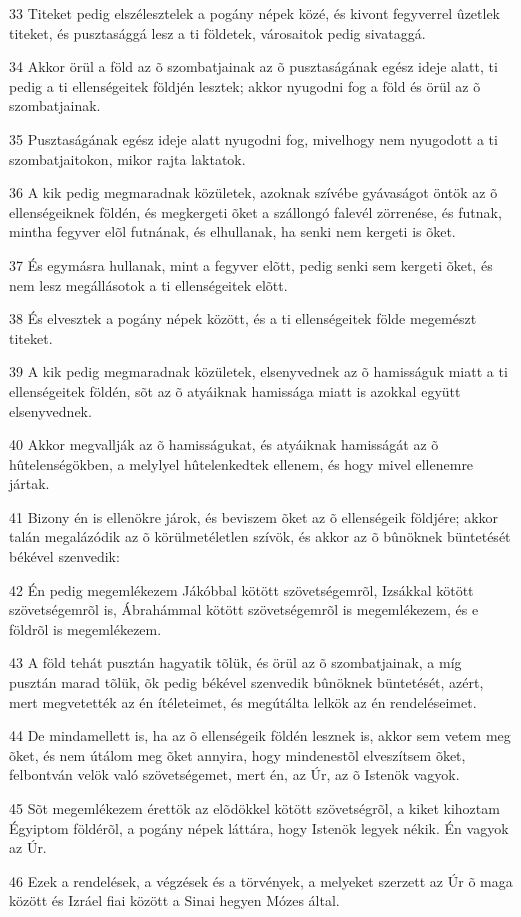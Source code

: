\par 33 Titeket pedig elszélesztelek a pogány népek közé, és kivont fegyverrel ûzetlek titeket, és pusztasággá lesz a ti földetek, városaitok pedig sivataggá.
\par 34 Akkor örül a föld az õ szombatjainak az õ pusztaságának egész ideje alatt, ti pedig a ti ellenségeitek földjén lesztek; akkor nyugodni fog a föld és örül az õ szombatjainak.
\par 35 Pusztaságának egész ideje alatt nyugodni fog, mivelhogy nem nyugodott a ti szombatjaitokon, mikor rajta laktatok.
\par 36 A kik pedig megmaradnak közületek, azoknak szívébe gyávaságot öntök az õ ellenségeiknek földén, és megkergeti õket a szállongó falevél zörrenése, és futnak, mintha fegyver elõl futnának, és elhullanak, ha senki nem kergeti is õket.
\par 37 És egymásra hullanak, mint a fegyver elõtt, pedig senki sem kergeti õket, és nem lesz megállásotok a ti ellenségeitek elõtt.
\par 38 És elvesztek a pogány népek között, és a ti ellenségeitek földe megemészt titeket.
\par 39 A kik pedig megmaradnak közületek, elsenyvednek az õ hamisságuk miatt a ti ellenségeitek földén, sõt az õ atyáiknak hamissága miatt is azokkal együtt elsenyvednek.
\par 40 Akkor megvallják az õ hamisságukat, és atyáiknak hamisságát az õ hûtelenségökben, a melylyel hûtelenkedtek ellenem, és hogy mivel ellenemre jártak.
\par 41 Bizony én is ellenökre járok, és beviszem õket az õ ellenségeik földjére; akkor talán megalázódik az õ körülmetéletlen szívök, és akkor az õ bûnöknek büntetését békével szenvedik:
\par 42 Én pedig megemlékezem Jákóbbal kötött szövetségemrõl, Izsákkal kötött szövetségemrõl is, Ábrahámmal kötött szövetségemrõl is megemlékezem, és e földrõl is megemlékezem.
\par 43 A föld tehát pusztán hagyatik tõlük, és örül az õ szombatjainak, a míg pusztán marad tõlük, õk pedig békével szenvedik bûnöknek büntetését, azért, mert megvetették az én ítéleteimet, és megútálta lelkök az én rendeléseimet.
\par 44 De mindamellett is, ha az õ ellenségeik földén lesznek is, akkor sem vetem meg õket, és nem útálom meg õket annyira, hogy mindenestõl elveszítsem õket, felbontván velök való szövetségemet, mert én, az Úr, az õ Istenök vagyok.
\par 45 Sõt megemlékezem érettök az elõdökkel kötött szövetségrõl, a kiket kihoztam Égyiptom földérõl, a pogány népek láttára, hogy Istenök legyek nékik. Én vagyok az Úr.
\par 46 Ezek a rendelések, a végzések és a törvények, a melyeket szerzett az Úr õ maga között és Izráel fiai között a Sinai hegyen Mózes által.

